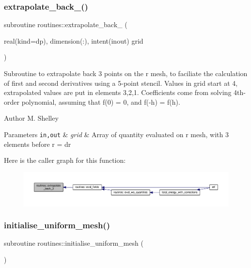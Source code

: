 \subsubsection{\texorpdfstring{extrapolate\+\_\+back\+\_()}{extrapolate\_back\_3()}}
{\footnotesize\ttfamily subroutine routines\+::extrapolate\+\_\+back\+\_ (\begin{DoxyParamCaption}\item[{real(kind=dp), dimension(\+:), intent(inout)}]{grid }\end{DoxyParamCaption})}



Subroutine to extrapolate back 3 points on the r mesh, to faciliate the calculation of first and second derivatives using a 5-\/point stencil. Values in grid start at 4, extrapolated values are put in elements 3,2,1. Coefficients come from solving 4th-\/order polynomial, assuming that f\textquotesingle{}(0) = 0, and f(-\/h) = f(h). 

\begin{DoxyAuthor}{Author}
M. Shelley 
\end{DoxyAuthor}

\begin{DoxyParams}[1]{Parameters}
\mbox{\tt in,out}  & {\em grid} & Array of quantity evaluated on r mesh, with 3 elements before r = dr \\
\hline
\end{DoxyParams}
Here is the caller graph for this function\+:
\nopagebreak
\begin{figure}[H]
\begin{center}
\leavevmode
\includegraphics[width=350pt]{namespaceroutines_af143340288720f8019e944ec7110a84e_icgraph}
\end{center}
\end{figure}
\mbox{\label{namespaceroutines_a5caa9b33bdf3c960b6bb3bfa96771181}} 
\subsubsection{\texorpdfstring{initialise\+\_\+uniform\+\_\+mesh()}{initialise\_uniform\_mesh()}}
{\footnotesize\ttfamily subroutine routines\+::initialise\+\_\+uniform\+\_\+mesh (\begin{DoxyParamCaption}{ }\end{DoxyParamCaption})}



